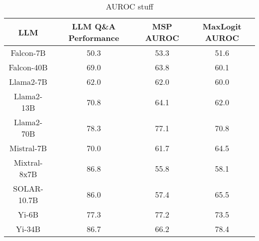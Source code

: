 \renewcommand\arraystretch{1.35}
\begin{table*}[tb]
\centering
\begin{tabular}{c|c|c|c}
LLM & LLM Q\&A Performance & MSP AUROC & MaxLogit AUROC\\ \hline
Falcon-7B & 50.3 & 53.3 & 51.6\\
Falcon-40B & 69.0 & 63.8 & 60.1\\
Llama2-7B & 62.0 & 62.0 & 60.0\\
Llama2-13B & 70.8 & 64.1 & 62.0\\
Llama2-70B & 78.3 & 77.1 & 70.8\\
Mistral-7B & 70.0 & 61.7 & 64.5\\
Mixtral-8x7B & 86.8 & 55.8 & 58.1\\
SOLAR-10.7B & 86.0 & 57.4 & 65.5\\
Yi-6B & 77.3 & 77.2 & 73.5\\
Yi-34B & 86.7 & 66.2 & 78.4\\
\hline
\end{tabular}
\caption{AUROC stuff}
\end{table*}
\label{tab:auroc}
